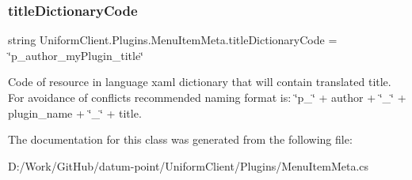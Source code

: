 \subsubsection{\texorpdfstring{title\+Dictionary\+Code}{titleDictionaryCode}}
{\footnotesize\ttfamily string Uniform\+Client.\+Plugins.\+Menu\+Item\+Meta.\+title\+Dictionary\+Code = \char`\"{}p\+\_\+author\+\_\+my\+Plugin\+\_\+title\char`\"{}}



Code of resource in language xaml dictionary that will contain translated title. For avoidance of conflicts recommended naming format is\+: \char`\"{}p\+\_\+\char`\"{} + author + \char`\"{}\+\_\+\char`\"{} + plugin\+\_\+name + \char`\"{}\+\_\+\char`\"{} + title. 



The documentation for this class was generated from the following file\+:\begin{DoxyCompactItemize}
\item 
D\+:/\+Work/\+Git\+Hub/datum-\/point/\+Uniform\+Client/\+Plugins/Menu\+Item\+Meta.\+cs\end{DoxyCompactItemize}

